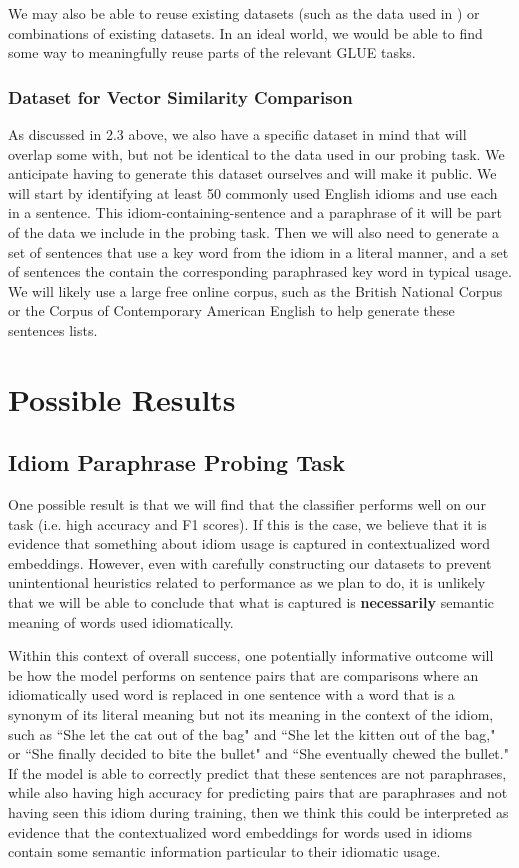 \documentclass[11pt,a4paper]{article}
\begin{document}
We may also be able to reuse existing datasets (such as the data used in \citet{bizzoni-lappin-2018-predicting}) or combinations of existing datasets. In an ideal world, we would be able to find some way to meaningfully reuse parts of the relevant GLUE tasks. 

\subsubsection{Dataset for Vector Similarity Comparison}
As discussed in 2.3 above, we also have a specific dataset in mind that will overlap some with, but not be identical to the data used in our probing task. We anticipate having to generate this dataset ourselves and will make it public. We will start by identifying at least 50 commonly used English idioms and use each in a sentence. This idiom-containing-sentence and a paraphrase of it will be part of the data we include in the probing task. Then we will also need to generate a set of sentences that use a key word from the idiom in a literal manner, and a set of sentences the contain the corresponding paraphrased key word in typical usage. We will likely use a large free online corpus, such as the British National Corpus or the Corpus of Contemporary American English to help generate these sentences lists.





\section{Possible Results}

\subsection{Idiom Paraphrase Probing Task}
One possible result is that we will find that the classifier performs well on our task (i.e. high accuracy and F1 scores). If this is the case, we believe that it is evidence that something about idiom usage is captured in contextualized word embeddings. However, even with carefully constructing our datasets to prevent unintentional heuristics related to performance as we plan to do, it is unlikely that we will be able to conclude that what is captured is \textbf{necessarily} semantic meaning of words used idiomatically. 

Within this context of overall success, one potentially informative outcome will be how the model performs on sentence pairs that are comparisons where an idiomatically used word is replaced in one sentence with a word that is a synonym of its literal meaning but not its meaning in the context of the idiom, such as ``She let the cat out of the bag" and ``She let the kitten out of the bag," or  ``She finally decided to bite the bullet" and ``She eventually chewed the bullet." If the model is able to correctly predict that these sentences are not paraphrases, while also having high accuracy for predicting pairs that are paraphrases and not having seen this idiom during training, then we think this could be interpreted as evidence that the contextualized word embeddings for words used in idioms contain some semantic information particular to their idiomatic usage.
\end{document}
